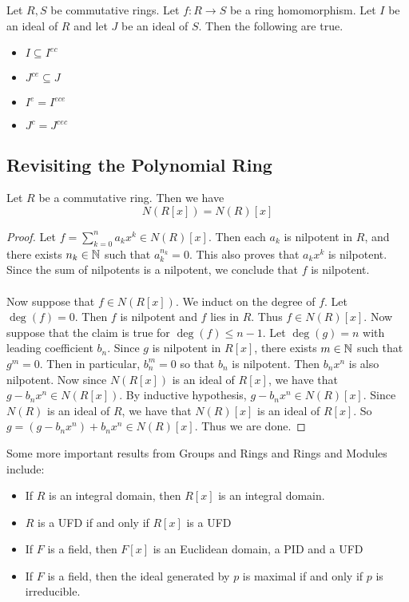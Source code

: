 \documentclass[a4paper]{article}
\begin{document}
\begin{prp}{}{} Let $R,S$ be commutative rings. Let $f:R\to S$ be a ring homomorphism. Let $I$ be an ideal of $R$ and let $J$ be an ideal of $S$. Then the following are true. 
\begin{itemize}
\item $I\subseteq I^{ec}$
\item $J^{ce}\subseteq J$
\item $I^e=I^{ece}$
\item $J^c=J^{cec}$
\end{itemize}
\end{prp}

\subsection{Revisiting the Polynomial Ring}
\begin{prp}{}{} Let $R$ be a commutative ring. Then we have $$N(R[x])=N(R)[x]$$ \tcbline
\begin{proof}
Let $f=\sum_{k=0}^na_kx^k\in N(R)[x]$. Then each $a_k$ is nilpotent in $R$, and there exists $n_k\in\mathbb{N}$ such that $a_k^{n_k}=0$. This also proves that $a_kx^k$ is nilpotent. Since the sum of nilpotents is a nilpotent, we conclude that $f$ is nilpotent. \\~\\

Now suppose that $f\in N(R[x])$. We induct on the degree of $f$. Let $\deg(f)=0$. Then $f$ is nilpotent and $f$ lies in $R$. Thus $f\in N(R)[x]$. Now suppose that the claim is true for $\deg(f)\leq n-1$. Let $\deg(g)=n$ with leading coefficient $b_n$. Since $g$ is nilpotent in $R[x]$, there exists $m\in\mathbb{N}$ such that $g^m=0$. Then in particular, $b_n^m=0$ so that $b_n$ is nilpotent. Then $b_nx^n$ is also nilpotent. Now since $N(R[x])$ is an ideal of $R[x]$, we have that $g-b_nx^n\in N(R[x])$. By inductive hypothesis, $g-b_nx^n\in N(R)[x]$. Since $N(R)$ is an ideal of $R$, we have that $N(R)[x]$ is an ideal of $R[x]$. So $g=(g-b_nx^n)+b_nx^n\in N(R)[x]$. Thus we are done. 
\end{proof}
\end{prp}

Some more important results from Groups and Rings and Rings and Modules include: 
\begin{itemize}
\item If $R$ is an integral domain, then $R[x]$ is an integral domain. 
\item $R$ is a UFD if and only if $R[x]$ is a UFD
\item If $F$ is a field, then $F[x]$ is an Euclidean domain, a PID and a UFD
\item If $F$ is a field, then the ideal generated by $p$ is maximal if and only if $p$ is irreducible. 
\end{itemize}
\end{document}
